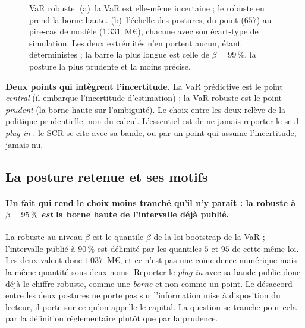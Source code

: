 \begin{figure}[htbp]\centering
{}
\caption{VaR robuste. (a)~la VaR est elle-même incertaine ; le robuste en prend la
borne haute. (b)~l'échelle des postures, du point ($657$) au pire-cas de modèle
($1\,331$~M\euro), chacune avec son écart-type de simulation. Les deux extrémités n'en
portent aucun, étant déterministes ; la barre la plus longue est celle de $\beta=99\,\%$, la
posture la plus prudente et la moins précise.}
\label{fig:robuste}
\end{figure}

\begin{cle}
\textbf{Deux points qui intègrent l'incertitude.} La VaR prédictive est le point
\emph{central} (il embarque l'incertitude d'estimation) ; la VaR robuste est le point
\emph{prudent} (la borne haute sur l'ambiguïté). Le choix entre les deux relève de la politique
prudentielle, non du calcul. L'essentiel est de ne jamais reporter le seul \emph{plug-in} : le
SCR se cite avec sa bande, ou par un point qui assume l'incertitude, jamais nu.
\end{cle}

\subsection*{La posture retenue et ses motifs}


\paragraph{Un fait qui rend le choix moins tranché qu'il n'y paraît : la robuste à
$\beta=95\,\%$ \emph{est} la borne haute de l'intervalle déjà publié.} La robuste au niveau
$\beta$ est le quantile $\beta$ de la loi bootstrap de la VaR ; l'intervalle publié à $90\,\%$ est
délimité par les quantiles $5$ et $95$ de cette même loi. Les deux valent donc $1\,037$~M\euro{},
et ce n'est pas une coïncidence numérique mais la même quantité sous deux noms. Reporter le
\emph{plug-in} avec sa bande publie donc déjà le chiffre robuste, comme une \emph{borne} et non
comme un point. Le désaccord entre les deux postures ne porte pas sur l'information mise à
disposition du lecteur, il porte sur ce qu'on appelle \og le \fg{} capital. La question se tranche
pour cela par la définition réglementaire plutôt que par la prudence.

